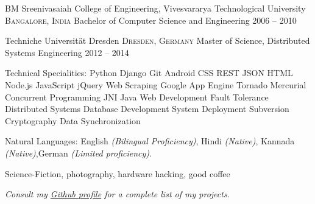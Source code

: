 \documentclass[10pt,a4paper]{article}
\begin{document}

\headedsection
  {BM Sreenivasaiah College of Engineering, Vivesvararya Technological University}
  {\textsc{Bangalore, India}} {%
  \headedsubsection
    {Bachelor of Computer Science and Engineering}
    {2006 -- 2010}
    {}
}

\headedsection
  {Techniche Universität Dresden}
  {\textsc{Dresden, Germany}} {%
  \headedsubsection
    {Master of Science, Distributed Systems Engineering}
    {2012 -- 2014}
    {}
}


\spacedhrule{0.5em}{-0.4em}


\inlineheadsection  %
  {Technical Specialities:}
  {
Python Django Git Android CSS REST JSON HTML Node.js
JavaScript
jQuery
Web Scraping Google App Engine Tornado
Mercurial
Concurrent Programming JNI
Java
Web Development
Fault Tolerance Distributed Systems Database Development System Deployment Subversion
Cryptography
Data Synchronization
}

\inlineheadsection
  {Natural Languages:}
  {English \emph{(Bilingual Proficiency)}, Hindi \emph{(Native)}, Kannada \emph{(Native)},German \emph{(Limited proficiency)}.}


\spacedhrule{1.6em}{-0.4em}


\inlineheadsection
  {Science-Fiction, photography, hardware hacking, good coffee}

\begin{center}
  \emph{Consult my \href{https://github.com/arjunrn}{Github profile} for a complete list of my projects.}
\end{center}
\end{document}
